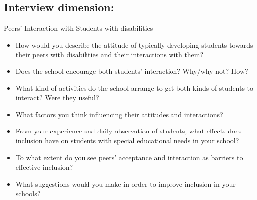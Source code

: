 \documentclass[11.5pt]{sig-alternate}
\begin{document}
\begin{large}
\subsection*{Interview dimension: }
Peers’ Interaction with Students with disabilities 
\begin{itemize}
    \item How would you describe the attitude of typically developing students towards their peers with disabilities and their interactions with them?
    \item Does the school encourage both students’ interaction? Why/why not? How?
    \item What kind of activities do the school arrange to get both kinds of students to interact? Were they useful? 
    \item What factors you think influencing their attitudes and interactions? 
    \item From your experience and daily observation of students, what effects does inclusion have on students with special educational needs in your school? 
    \item To what extent do you see peers’ acceptance and interaction as barriers to effective inclusion? 
    \item What suggestions would you make in order to improve inclusion in your schools? 
\end{itemize}

\end{large}
\end{document}
